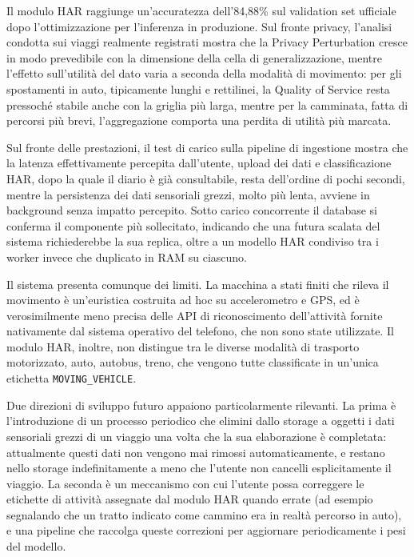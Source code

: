 \documentclass[conference]{IEEEtran}
\begin{document}
Il modulo HAR raggiunge un'accuratezza dell'84,88\% sul validation set
ufficiale dopo l'ottimizzazione per l'inferenza in produzione. Sul
fronte privacy, l'analisi condotta sui viaggi realmente registrati
mostra che la Privacy Perturbation cresce in modo prevedibile con la
dimensione della cella di generalizzazione, mentre l'effetto
sull'utilità del dato varia a seconda della modalità di movimento: per
gli spostamenti in auto, tipicamente lunghi e rettilinei, la Quality
of Service resta pressoché stabile anche con la griglia più larga,
mentre per la camminata, fatta di percorsi più brevi, l'aggregazione
comporta una perdita di utilità più marcata.

Sul fronte delle prestazioni, il test di carico sulla pipeline di
ingestione mostra che la latenza effettivamente percepita
dall'utente, upload dei dati e classificazione HAR, dopo la quale
il diario è già consultabile, resta dell'ordine di pochi secondi,
mentre la persistenza dei dati sensoriali grezzi, molto più lenta,
avviene in background senza impatto percepito. Sotto carico
concorrente il database si conferma il componente più sollecitato,
indicando che una futura scalata del sistema richiederebbe la sua
replica, oltre a un modello HAR condiviso tra i worker invece che
duplicato in RAM su ciascuno.

Il sistema presenta comunque dei limiti. La macchina a stati finiti
che rileva il movimento è un'euristica costruita ad hoc su
accelerometro e GPS, ed è verosimilmente meno precisa delle API di
riconoscimento dell'attività fornite nativamente dal sistema
operativo del telefono, che non sono state utilizzate. Il modulo HAR,
inoltre, non distingue tra le diverse modalità di trasporto
motorizzato, auto, autobus, treno, che vengono tutte classificate
in un'unica etichetta \texttt{MOVING\_VEHICLE}.

Due direzioni di sviluppo futuro appaiono particolarmente rilevanti.
La prima è l'introduzione di un processo periodico che elimini dallo
storage a oggetti i dati sensoriali grezzi di un viaggio una volta che
la sua elaborazione è completata: attualmente questi dati non vengono
mai rimossi automaticamente, e restano nello storage indefinitamente
a meno che l'utente non cancelli esplicitamente il viaggio. La
seconda è un meccanismo con cui l'utente possa correggere le
etichette di attività assegnate dal modulo HAR quando errate (ad
esempio segnalando che un tratto indicato come cammino era in realtà
percorso in auto), e una pipeline che raccolga queste correzioni per
aggiornare periodicamente i pesi del modello.
\end{document}
